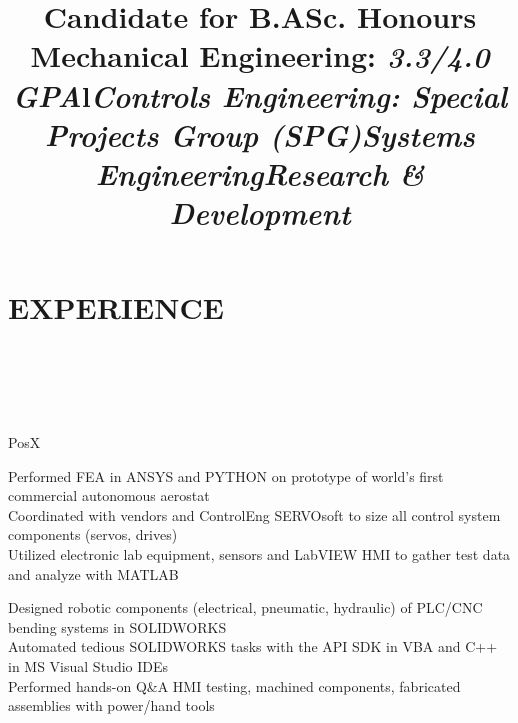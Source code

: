 \documentclass[mm]{res}
\newcommand{\tb}{\textbullet \xspace}
\begin{document}
\begin{resume}
\title{Candidate for B.ASc. Honours Mechanical Engineering: \textit{3.3/4.0 GPA}}
\begin{position}
\end{position}


\section{EXPERIENCE \xspace}
\begin{format}
\\
\title{l}\\
\body\\
\end{format}

\title{\textit{Controls Engineering: Special Projects Group (SPG)}}
\begin{position}
\tb PosX
\end{position}

\title{\textit{Systems Engineering}}
\begin{position}
\tb Performed FEA in ANSYS and PYTHON on prototype of world’s first commercial autonomous aerostat \\
\tb Coordinated with vendors and ControlEng SERVOsoft to size all control system components (servos, drives) \\
\tb Utilized electronic lab equipment, sensors and LabVIEW HMI to gather test data and analyze with MATLAB
\end{position}

\title{\textit{Research \& Development}}
\begin{position}
\tb Designed robotic components (electrical, pneumatic, hydraulic) of PLC/CNC bending systems in SOLIDWORKS \\
\tb Automated tedious SOLIDWORKS tasks with the API SDK in VBA and C++ in MS Visual Studio IDEs \\
\tb Performed hands-on Q\&A HMI testing, machined components, fabricated assemblies with power/hand tools
\end{position}


\end{resume}
\end{document}

